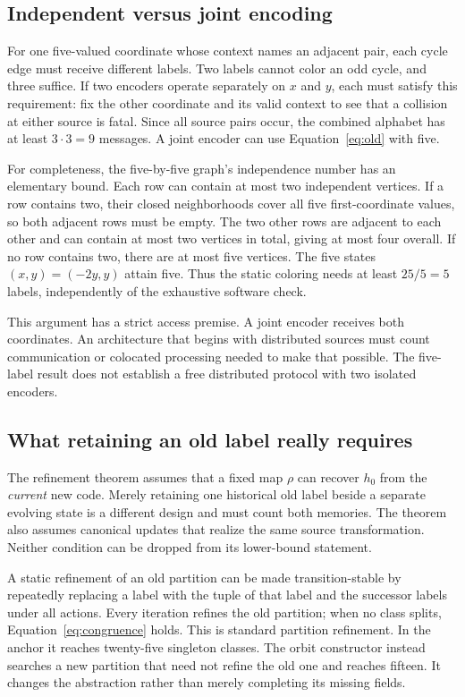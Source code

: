 \documentclass[11pt,letterpaper]{article}
\theoremstyle{remark}\newtheorem{remark}{Remark}[section]
\begin{document}
\subsection{Independent versus joint encoding}
For one five-valued coordinate whose context names an adjacent pair, each cycle edge must receive different labels. Two labels cannot color an odd cycle, and three suffice. If two encoders operate separately on $x$ and $y$, each must satisfy this requirement: fix the other coordinate and its valid context to see that a collision at either source is fatal. Since all source pairs occur, the combined alphabet has at least $3\cdot3=9$ messages. A joint encoder can use Equation~\eqref{eq:old} with five.

For completeness, the five-by-five graph's independence number has an elementary bound. Each row can contain at most two independent vertices. If a row contains two, their closed neighborhoods cover all five first-coordinate values, so both adjacent rows must be empty. The two other rows are adjacent to each other and can contain at most two vertices in total, giving at most four overall. If no row contains two, there are at most five vertices. The five states $(x,y)=(-2y,y)$ attain five. Thus the static coloring needs at least $25/5=5$ labels, independently of the exhaustive software check.

This argument has a strict access premise. A joint encoder receives both coordinates. An architecture that begins with distributed sources must count communication or colocated processing needed to make that possible. The five-label result does not establish a free distributed protocol with two isolated encoders.

\subsection{What retaining an old label really requires}
The refinement theorem assumes that a fixed map $\rho$ can recover $h_0$ from the \emph{current} new code. Merely retaining one historical old label beside a separate evolving state is a different design and must count both memories. The theorem also assumes canonical updates that realize the same source transformation. Neither condition can be dropped from its lower-bound statement.

A static refinement of an old partition can be made transition-stable by repeatedly replacing a label with the tuple of that label and the successor labels under all actions. Every iteration refines the old partition; when no class splits, Equation~\eqref{eq:congruence} holds. This is standard partition refinement. In the anchor it reaches twenty-five singleton classes. The orbit constructor instead searches a new partition that need not refine the old one and reaches fifteen. It changes the abstraction rather than merely completing its missing fields.
\end{document}
